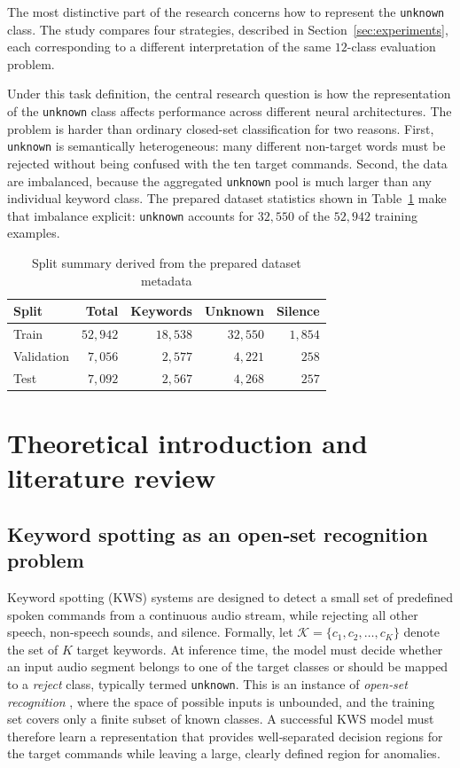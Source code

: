 \documentclass[11pt]{article}
\begin{document}
The most distinctive part of the research concerns how to represent the \texttt{unknown} class. The study compares four strategies, described in Section~\ref{sec:experiments}, each corresponding to a different interpretation of the same \(12\)-class evaluation problem.

Under this task definition, the central research question is how the representation of the \texttt{unknown} class affects performance across different neural architectures. The problem is harder than ordinary closed-set classification for two reasons. First, \texttt{unknown} is semantically heterogeneous: many different non-target words must be rejected without being confused with the ten target commands. Second, the data are imbalanced, because the aggregated \texttt{unknown} pool is much larger than any individual keyword class. The prepared dataset statistics shown in Table~\ref{tab:split-summary} make that imbalance explicit: \texttt{unknown} accounts for \(32{,}550\) of the \(52{,}942\) training examples.

\begin{table}[t!]
\centering
\caption{Split summary derived from the prepared dataset metadata}
\label{tab:split-summary}
\smallskip
\small
\begin{tabular}{@{}lrrrr@{}}
\toprule
\textbf{Split} & \textbf{Total} & \textbf{Keywords} & \textbf{Unknown} & \textbf{Silence}\\
\midrule
Train & \(52{,}942\) & \(18{,}538\) & \(32{,}550\) & \(1{,}854\) \\
Validation & \(7{,}056\) & \(2{,}577\) & \(4{,}221\) & \(258\) \\
Test & \(7{,}092\) & \(2{,}567\) & \(4{,}268\) & \(257\) \\
\bottomrule
\end{tabular}
\end{table}

\section{Theoretical introduction and literature review}
\label{sec:theory}

\subsection{Keyword spotting as an open‑set recognition problem}
Keyword spotting (KWS) systems are designed to detect a small set of predefined spoken commands from a continuous audio stream, while rejecting all other speech, non‑speech sounds, and silence. 
Formally, let $\mathcal{K} = \{c_1, c_2, \dots, c_K\}$ denote the set of $K$ target keywords. 
At inference time, the model must decide whether an input audio segment belongs to one of the target classes or should be mapped to a \emph{reject} class, typically termed \texttt{unknown}. 
This is an instance of \emph{open‑set recognition} \cite{openmax}, where the space of possible inputs is unbounded, and the training set covers only a finite subset of known classes. 
A successful KWS model must therefore learn a representation that provides well‑separated decision regions for the target commands while leaving a large, clearly defined region for anomalies.
\end{document}
